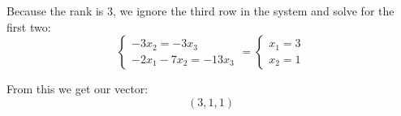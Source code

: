\documentclass[11pt]{article}
\begin{document}
Because the rank is 3, we ignore the third row in the system and solve for the first two:
\[
\left\{
\begin{aligned}
-3x_2 = -3x_3 \\
-2x_1 -7x_2 = -13x_3
\end{aligned}
=
\left\{
\begin{aligned}
x_1 = 3 \\
x_2 = 1
\end{aligned}
\]

From this we get our vector:
\[
(3,1,1)
\]
\end{document}
